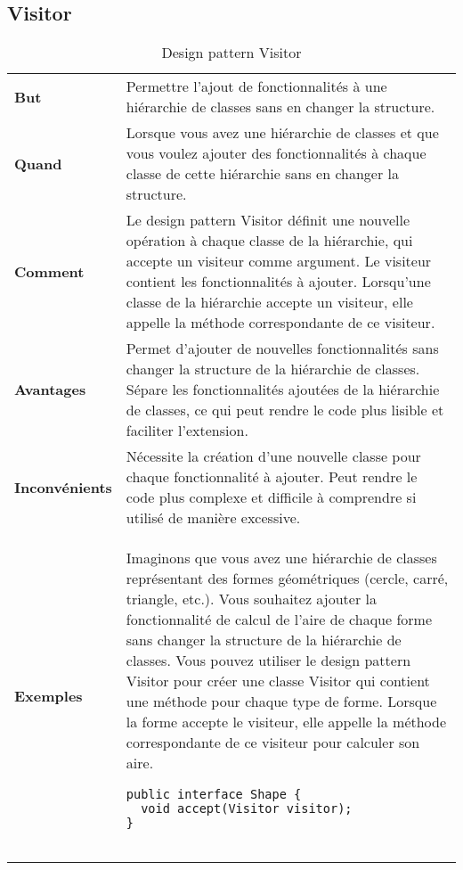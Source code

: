 \subsection{Visitor}\label{subsec:visitor}
\begin{minipage}[t]{1\textwidth}
\begin{definition}
\end{definition}


\begin{table}[H]
\caption{Design pattern Visitor}
\label{tbl:design_patterns_visitor}
\begin{adjustbox}{max width=\textwidth}
\begin{tabular}{l|p{\textwidth}}
\toprule
\textbf{But} & Permettre l'ajout de fonctionnalités à une hiérarchie de classes sans en changer la structure. \\
\cmidrule(lr){1-2}
\textbf{Quand} & Lorsque vous avez une hiérarchie de classes et que vous voulez ajouter des fonctionnalités à chaque classe de cette hiérarchie sans en changer la structure. \\
\cmidrule(lr){1-2}
\textbf{Comment} & Le design pattern Visitor définit une nouvelle opération à chaque classe de la hiérarchie, qui accepte un visiteur comme argument. Le visiteur contient les fonctionnalités à ajouter. Lorsqu'une classe de la hiérarchie accepte un visiteur, elle appelle la méthode correspondante de ce visiteur. \\
\cmidrule(lr){1-2}
\textbf{Avantages} & Permet d'ajouter de nouvelles fonctionnalités sans changer la structure de la hiérarchie de classes. Sépare les fonctionnalités ajoutées de la hiérarchie de classes, ce qui peut rendre le code plus lisible et faciliter l'extension. \\
\cmidrule(lr){1-2}
\textbf{Inconvénients} & Nécessite la création d'une nouvelle classe pour chaque fonctionnalité à ajouter. Peut rendre le code plus complexe et difficile à comprendre si utilisé de manière excessive. \\
\cmidrule(lr){1-2}
\multirow{2}{*}{\textbf{Exemples}} & 
\hspace{4mm}
\begin{minipage}[tl]{0.5\textwidth}
Imaginons que vous avez une hiérarchie de classes représentant des formes géométriques (cercle, carré, triangle, etc.). Vous souhaitez ajouter la fonctionnalité de calcul de l'aire de chaque forme sans changer la structure de la hiérarchie de classes. Vous pouvez utiliser le design pattern Visitor pour créer une classe Visitor qui contient une méthode pour chaque type de forme. Lorsque la forme accepte le visiteur, elle appelle la méthode correspondante de ce visiteur pour calculer son aire.  
\begin{lstlisting}[style=monstyle]
public interface Shape {
  void accept(Visitor visitor);
}


\end{lstlisting}
\end{minipage}
\end{tabular}
\end{adjustbox}
\end{table}
\end{minipage}
